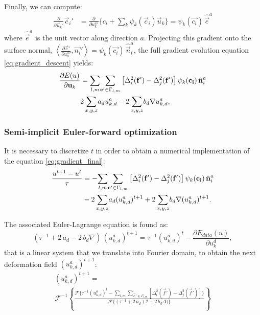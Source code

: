 Finally, we can compute:
\begin{align}
\frac{\partial}{\partial {\vec{u}_k}'}{\vec{c}_i}' &= \frac{\partial}{\partial {u^a_k}'} 
\lbrace c_i + \sum_k \psi_k(\vec{c}_i) \vec{u}_k \rbrace
= \psi_k(\vec{c_i})\, \hat{\vec{e}}^a
\end{align}
where $\hat{\vec{e}}^a$ is the unit vector along direction $a$. Projecting
this gradient onto the surface normal,
$\left\langle \frac{\partial \vec{c}'}{\partial {u^a_k}'}, \vec{n_i}'\right\rangle
= \psi_k(\vec{c_i})\, \hat{\vec{n}}_i^a$, the
full gradient evolution equation \eqref{eq:gradient_descent} yields:
\begin{align}
\frac{\partial E(u)}{\partial \vec{u}_k} 
&= \underset{l,m}{\sum} \underset{\vec{c}' \in \Gamma_{l,m}}{\sum}
\left[ \Delta^2_i (\vec{f}' ) - \Delta^2_j (\vec{f}')\right]
\psi_k(\vec{c_i})\, \hat{\vec{n}}_i^a \notag\\
&2\, \underset{x,y,z}{\sum} a_d u^a_{k,d}
-2\, \underset{x,y,z}{\sum} b_d \nabla u^a_{k,d},
\label{eq:gradient_final}
\end{align}

\subsubsection{Semi-implicit Euler-forward optimization}
It is necessary to discretize $t$ in order to obtain a numerical
implementation of the equation \eqref{eq:gradient_final}:
\begin{align}
\frac{u^{t+1}-u^{t}}{\tau} 
&= - \underset{l,m}{\sum} \underset{\vec{c}' \in \Gamma_{l,m}}{\sum}
\left[ \Delta^2_i (\vec{f}' ) - \Delta^2_j (\vec{f}')\right]
\psi_k(\vec{c_i})\, \hat{\vec{n}}_i^a \notag\\
&-2\, \underset{x,y,z}{\sum} a_d (u^a_{k,d})^{t+1}
+2\, \underset{x,y,z}{\sum} b_d \nabla (u^a_{k,d})^{t+1}.
\end{align}

The associated Euler-Lagrange equation is found as:
\begin{equation}
(\tau^{-1} +2\, a_d - 2\, b_d \nabla )\,(u^a_{k,d})^{t+1} = 
\tau^{-1} (u^a_{k,d})^{t} - \frac{\partial E_{data}(u)}{\partial u^d_k},
\end{equation}
that is a linear system that we translate into Fourier domain,
to obtain the next deformation field $(u^a_{k,d})^{t+1}$:
\begin{multline}
(u^a_{k,d})^{t+1} = \\
 \mathcal{F}^{-1} \left\lbrace
\frac{\mathcal{F}\lbrace \tau^{-1} (u^a_{k,d})^{t} - \underset{l,m}{\sum} \underset{\vec{c}' \in \Gamma_{l,m}}{\sum}
\left[ \Delta^2_i (\vec{f}' ) - \Delta^2_j (\vec{f}')\right] \rbrace}
     {\mathcal{F}\lbrace (\tau^{-1} +2\,a_d)\mathcal{I} - 2\,b_d \Delta ) \rbrace}
     \right\rbrace
\end{multline}

